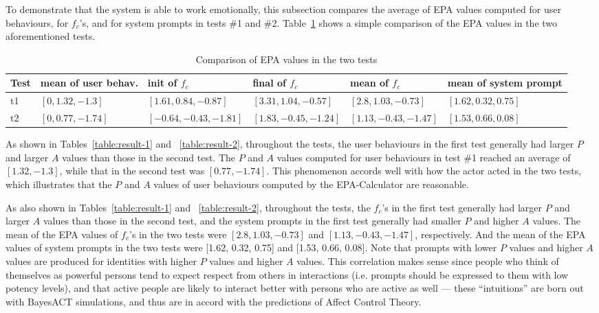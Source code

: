 To demonstrate that the system is able to work emotionally, this subsection compares the average of EPA values computed for user behaviours, for $f_c$'s, and for system prompts in tests \#1 and \#2. Table~\ref{table:compare-epa-the-two} shows a simple comparison of the EPA values in the two aforementioned tests. 

%
\begin{table}\footnotesize
\centering
\caption{Comparison of EPA values in the two tests}
\label{table:compare-epa-the-two}
\begin{tabular}{|  p{0.5cm} | p{2.1cm} |  p{3.1cm} |  p{2.9cm} |  p{2.9cm} | p{2.3cm} |}
\hline
Test & mean of user behav. & init of $f_c$ & final of $f_c$ & mean of $f_c$ & mean of system prompt \\ \hline
t1 & $[0,1.32,-1.3]$ & $[1.61,0.84,-0.87]$ & $[3.31,1.04,-0.57]$ & $[2.8,1.03,-0.73]$ & $[1.62,0.32,0.75]$ \\ \hline
t2 & $[0,0.77,-1.74]$ & $[-0.64,-0.43,-1.81]$ & $[1.83,-0.45,-1.24]$ & $[1.13,-0.43,-1.47]$ & $[1.53,0.66,0.08]$ \\ \hline
\end{tabular}
\end{table}

As shown in Tables~\ref{table:result-1} and ~\ref{table:result-2}, throughout the tests, the user behaviours in the first test generally had larger $P$ and larger $A$ values than those in the second test. The $P$ and $A$ values computed for user behaviours in test \#1 reached an average of $[1.32, -1.3]$, while that in the second test was $[0.77, -1.74]$. This phenomenon accords well with how the actor acted in the two tests, which illustrates that the $P$ and $A$ values of user behaviours computed by the EPA-Calculator are reasonable.

As also shown in Tables~\ref{table:result-1} and ~\ref{table:result-2}, throughout the tests, the $f_c$'s in the first test generally had larger $P$ and larger $A$ values than those in the second test, and the system prompts in the first test generally had smaller $P$ and higher $A$ values. The mean of the EPA values of $f_c$'s in the two tests were $[2.8, 1.03, -0.73]$ and $[1.13, -0.43, -1.47]$, respectively. And the mean of the EPA values of system prompts in the two tests were [1.62, 0.32, 0.75] and [1.53, 0.66, 0.08]. Note that prompts with lower $P$ values and higher $A$ values are produced for identities with higher $P$ values and higher $A$ values. This correlation makes sense since people who think of themselves as powerful persons tend to expect respect from others in interactions (i.e. prompts should be expressed to them with low potency levels), and that active people are likely to interact better with persons who are active as well --- these ``intuitions'' are born out with BayesACT simulations, and thus are in accord with the predictions of Affect Control Theory.

